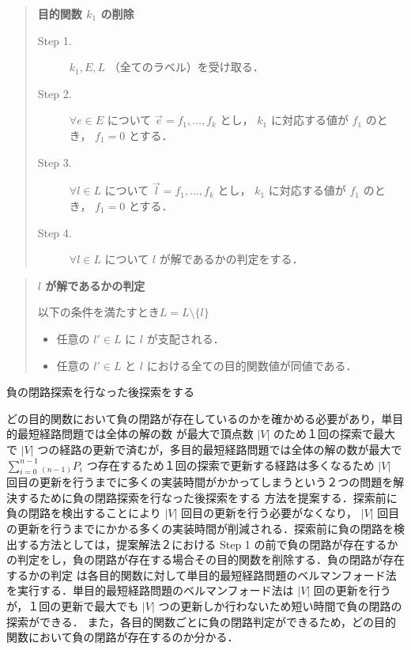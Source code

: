 \documentclass[12pt]{optlab-bachelor}
\begin{document}
\begin{quote}
  \textbf{目的関数 $k_1$ の削除}
  \begin{description}
    \item[Step 1.] $k_1,E,L$ （全てのラベル）を受け取る．
    \item[Step 2.] $\forall e \in E$ について $\vec{e}={f_1,\ldots,f_k}$ とし， $k_1$ に対応する値が
    $f_1$ のとき， $f_1=0$ とする．
    \item[Step 3.] $\forall l \in L$ について $\vec{l}={f_1,\ldots,f_k}$ とし， $k_1$ に対応する値が
    $f_1$ のとき， $f_1=0$ とする．
    \item[Step 4.] $\forall l \in L$ について $l$ が解であるかの判定をする．
  \end{description}
\end{quote}

\begin{quote}
  \textbf{ $l$ が解であるかの判定}

  以下の条件を満たすとき$L=L \setminus \{ l\}$
    \begin{itemize}
      \item 任意の $l' \in L$ に $l$ が支配される．
      \item 任意の $l' \in L$ と $l$ における全ての目的関数値が同値である．
    \end{itemize}
\end{quote}

\begin{description}
  \item[負の閉路探索を行なった後探索をする]
\end{description}

どの目的関数において負の閉路が存在しているのかを確かめる必要があり，単目的最短経路問題では全体の解の数
が最大で頂点数 $|V|$ のため１回の探索で最大で $|V|$ つの経路の更新で済むが，多目的最短経路問題では全体の解の数が最大で
$\displaystyle \sum_{i=0}^{n-1} {}_{(n-1)}P_i$ つ存在するため１回の探索で更新する経路は多くなるため
$|V|$ 回目の更新を行うまでに多くの実装時間がかかってしまうという２つの問題を解決するために負の閉路探索を行なった後探索をする
方法を提案する．探索前に負の閉路を検出することにより $|V|$ 回目の更新を行う必要がなくなり，
$|V|$ 回目の更新を行うまでにかかる多くの実装時間が削減される．探索前に負の閉路を検出する方法としては，提案解法２における
Step 1 の前で負の閉路が存在するかの判定をし，負の閉路が存在する場合その目的関数を削除する．負の閉路が存在するかの判定
は各目的関数に対して単目的最短経路問題のベルマンフォード法を実行する．単目的最短経路問題のベルマンフォード法は
 $|V|$ 回の更新を行うが，１回の更新で最大でも $|V|$ つの更新しか行わないため短い時間で負の閉路の探索ができる．
また，各目的関数ごとに負の閉路判定ができるため，どの目的関数において負の閉路が存在するのか分かる．
\end{document}
